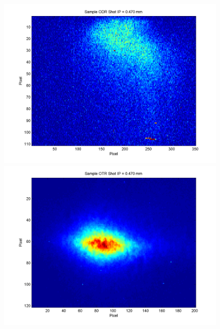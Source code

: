 \documentclass[12pt]{article}
\begin{document}
\begin{figure}
\begin{center}
\includegraphics[scale=0.5]{Figures/Sample_ODR_470.PNG}
\includegraphics[scale=0.5]{Figures/Sample_OTR_470.PNG}
\caption{}
\end{center}
\end{figure}
\end{document}
